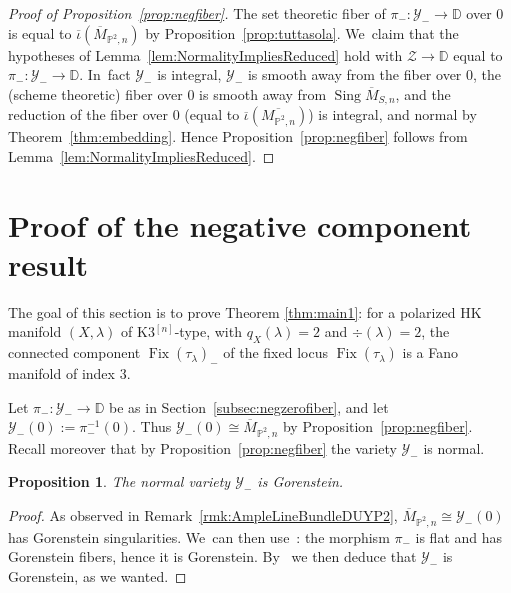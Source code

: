 \documentclass[11pt]{article}
\newcommand{\HK}{\textup{HK}\xspace}
\newcommand{\DD}{{\mathbb D}}
\newcommand{\PP}{{\mathbb P}}\let\P\PP
\newcommand\cY{\mathcal{Y}}
\DeclareMathOperator{\Fix}{Fix}
\DeclareMathOperator{\Sing}{Sing}
\let\ov\overline
\newtheorem{prop}[lemm]{Proposition}
\theoremstyle{definition}
\def\citestacks#1{\cite[\href{https://stacks.math.columbia.edu/tag/#1}{Tag #1}]{stacks-project}}
\begin{document}
\begin{proof}[Proof of Proposition~\ref{prop:negfiber}]
The set theoretic fiber of $\pi_{-}\colon\cY_{-}\to\DD$ over $0$ is equal to $\ov{\iota}(\ov{M}_{\PP^2,n})$ by Proposition~\ref{prop:tuttasola}. We~claim that the hypotheses of Lemma~\ref{lem:NormalityImpliesReduced} hold with $\mathcal{Z}\to\DD$ equal to $\pi_{-}\colon\cY_{-}\to\DD$. In~fact $\cY_{-}$ is integral, $\cY_{-}$ is smooth away from the fiber over $0$, the (scheme theoretic) fiber over $0$ is smooth away from $\Sing \ov{M}_{S,n}$, and the reduction of the fiber over $0$ (equal to $\ov{\iota}(\ov{M{_{\PP^2,n}}})$) is integral, and normal by Theorem~\ref{thm:embedding}. Hence Proposition~\ref{prop:negfiber} follows from Lemma~\ref{lem:NormalityImpliesReduced}.
\end{proof}

\section{Proof of the negative component result}\label{sec:MainResult}

The goal of this section is to prove Theorem \ref{thm:main1}: for a polarized \HK manifold $(X,\lambda)$ of K3$^{[n]}$-type, with $q_X(\lambda)=2$ and $\div(\lambda)=2$, the connected component $\Fix(\tau_{\lambda})_-$ of the fixed locus $\Fix(\tau_\lambda)$ is a Fano manifold of index $3$.

Let $\pi_{-}\colon\cY_{-}\to \DD$ be as in Section~\ref{subsec:negzerofiber}, and let $\cY_{-}(0):=\pi_{-}^{-1}(0)$.
Thus $\cY_{-}(0)\cong\overline{M}_{\PP^2,n}$ by Proposition~\ref{prop:negfiber}.
Recall moreover that by Proposition~\ref{prop:negfiber} the variety $\cY_{-}$ is normal.

\begin{prop}\label{prop:KM}
The normal variety $\cY_-$ is Gorenstein.
\end{prop}

\begin{proof}
As observed in Remark~\ref{rmk:AmpleLineBundleDUYP2}, $\overline{M}_{\PP^2,n}\cong\cY_{-}(0)$ has Gorenstein singularities. We~can then use~\citestacks{0C05}: the morphism $\pi_-$ is flat and has Gorenstein fibers, hence it is Gorenstein.
By~\citestacks{0C11} we then deduce that $\cY_-$ is Gorenstein, as we wanted.
\end{proof}
\end{document}
